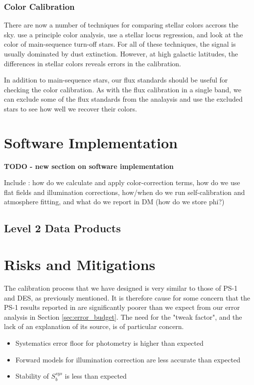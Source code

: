 \documentclass[12pt,preprint]{aastex}
\begin{document}
\subsubsection{Color Calibration}

There are now a number of techniques for comparing stellar colors
accross the sky.  \citet{Ivezic04} use a principle color analysis,
\citet{High09} use a stellar locus regression, and \citet{Schlafly10}
look at the color of main-sequence turn-off stars.  For all of these
techniques, the signal is usually dominated by dust extinction.
However, at high galactic latitudes, the differences in stellar colors
reveals errors in the calibration.

In addition to main-sequence stars, our flux standards should be
useful for checking the color calibration.  As with the flux
calibration in a single band, we can exclude some of the flux
standards from the analaysis and use the excluded stars to see how
well we recover their colors.


\section{Software Implementation}
\label{sec:software}

{\bf TODO - new section on software implementation } 

Include : how do we calculate and apply color-correction terms, how do
we use flat fields and illumination corrections, how/when do we run
self-calibration and atmosphere fitting, and what do we report in DM
(how do we store phi?)
\subsection{Level 2 Data Products}

\section{Risks and Mitigations}

The calibration process that we have designed is very similar to those of PS-1 and DES, as previously mentioned.  It is therefore
cause for some concern that the PS-1 results reported in \citep{Tonry2012} are significantly poorer than we expect from our
error analysis in Section \ref{sec:error_budget}.  The need for the "tweak factor", and the lack of an explanation of its source, is of particular concern.

\begin{itemize}
\item Systematics error floor for photometry is higher than expected
\item Forward models for illumination correction are less accurate than expected
\item Stability of $S_b^{sys}$ is less than expected
\end{itemize}
\end{document}
